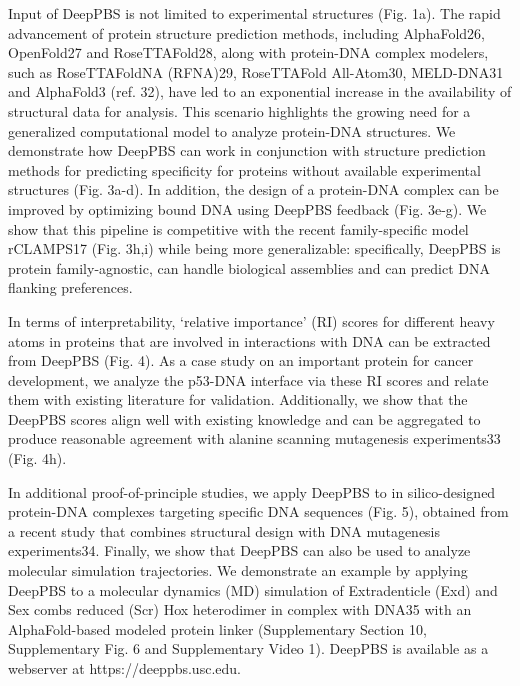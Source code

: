 \par
Input of DeepPBS is not limited to experimental structures (Fig. 1a). The rapid advancement of protein structure prediction methods, including AlphaFold26, OpenFold27 and RoseTTAFold28, along with protein-DNA complex modelers, such as RoseTTAFoldNA (RFNA)29, RoseTTAFold All-Atom30, MELD-DNA31 and AlphaFold3 (ref. 32), have led to an exponential increase in the availability of structural data for analysis. This scenario highlights the growing need for a generalized computational model to analyze protein-DNA structures. We demonstrate how DeepPBS can work in conjunction with structure prediction methods for predicting specificity for proteins without available experimental structures (Fig. 3a-d). In addition, the design of a protein-DNA complex can be improved by optimizing bound DNA using DeepPBS feedback (Fig. 3e-g). We show that this pipeline is competitive with the recent family-specific model rCLAMPS17 (Fig. 3h,i) while being more generalizable: specifically, DeepPBS is protein family-agnostic, can handle biological assemblies and can predict DNA flanking preferences.
\par
In terms of interpretability, ‘relative importance’ (RI) scores for different heavy atoms in proteins that are involved in interactions with DNA can be extracted from DeepPBS (Fig. 4). As a case study on an important protein for cancer development, we analyze the p53-DNA interface via these RI scores and relate them with existing literature for validation. Additionally, we show that the DeepPBS scores align well with existing knowledge and can be aggregated to produce reasonable agreement with alanine scanning mutagenesis experiments33 (Fig. 4h).
\par
In additional proof-of-principle studies, we apply DeepPBS to in silico-designed protein-DNA complexes targeting specific DNA sequences (Fig. 5), obtained from a recent study that combines structural design with DNA mutagenesis experiments34. Finally, we show that DeepPBS can also be used to analyze molecular simulation trajectories. We demonstrate an example by applying DeepPBS to a molecular dynamics (MD) simulation of Extradenticle (Exd) and Sex combs reduced (Scr) Hox heterodimer in complex with DNA35 with an AlphaFold-based modeled protein linker (Supplementary Section 10, Supplementary Fig. 6 and Supplementary Video 1). DeepPBS is available as a webserver at https://deeppbs.usc.edu.
\par
